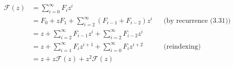 \begin{align*}
	\mathcal{F}(z) &= \sum_{i=0}^\infty F_iz^i \\
	&= F_0+zF_1+\sum_{i=2}^\infty(F_{i-1}+F_{i-2})z^i && \text{(by recurrence (3.31))} \\
	&= z+\sum_{i=2}^\infty F_{i-1}z^i+\sum_{i=2}^\infty F_{i-2}z^i \\
	&= z+\sum_{i=1}^\infty F_iz^{i+1}+\sum_{i=0}^\infty F_iz^{i+2} && \text{(reindexing)} \\[1mm]
	&= z+z\mathcal{F}(z)+z^2\mathcal{F}(z)
\end{align*}
